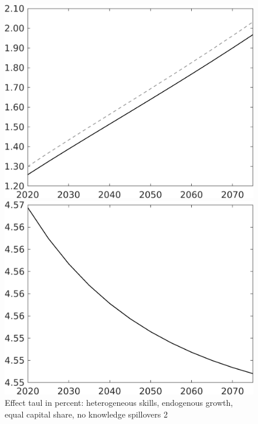 \documentclass[12pt]{article}
\begin{document}
\begin{figure}[h!!]
	\centering
	\caption{Effect taul in percent: heterogeneous skills, endogenous growth, equal capital share, no knowledge spillovers 2}\label{fig:LF_BAU_nsk0_xgr0_equalcapShare_noknow2}
		
	\begin{minipage}[]{0.32\textwidth}
		\includegraphics[width=1\textwidth]{../../codding_model/own_basedOnFried/optimalPol_010922_revision/figures/all_13Sept22/CompTaul_Equlab_LFBAU_Reg0_wl_spillover0_nsk0_xgr0_knspil1_sep1_countec0_GovRev0_etaa0.79_lgd0.png}
	\end{minipage}	
	\begin{minipage}[]{0.32\textwidth}
		\includegraphics[width=1\textwidth]{../../codding_model/own_basedOnFried/optimalPol_010922_revision/figures/all_13Sept22/CompTaul_Equlab_LFBAUPer_Reg0_wh_spillover0_nsk0_xgr0_knspil1_sep1_countec0_GovRev0_etaa0.79.png}

\end{minipage}
\end{figure}
\end{document}
